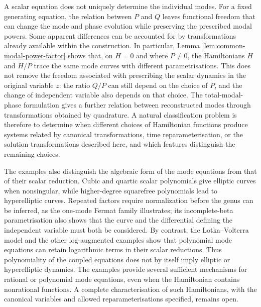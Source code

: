 \documentclass[11pt,a4paper]{article}
\numberwithin{equation}{section}
\begin{document}
A scalar equation does not uniquely determine the individual modes.
For a fixed generating equation, the relation between $P$ and $Q$ leaves functional freedom that can change the mode and phase evolution while preserving the prescribed modal powers.
Some apparent differences can be accounted for by transformations already available within the construction.
In particular, Lemma \ref{lem:common-modal-power-factor} shows that, on $H=0$ and where $P\ne0$, the Hamiltonians $H$ and $H/P$ trace the same mode curves with different parametrisations.
This does not remove the freedom associated with prescribing the scalar dynamics in the original variable $z$: the ratio $Q/P$ can still depend on the choice of $P$, and the change of independent variable also depends on that choice.
The total-modal-phase formulation gives a further relation between reconstructed modes through transformations obtained by quadrature.
A natural classification problem is therefore to determine when different choices of Hamiltonian functions produce systems related by canonical transformations, time reparameterisation, or the solution transformations described here, and which features distinguish the remaining choices.

The examples also distinguish the algebraic form of the mode equations from that of their scalar reduction.
Cubic and quartic scalar polynomials give elliptic curves when nonsingular, while higher-degree squarefree polynomials lead to hyperelliptic curves.
Repeated factors require normalization before the genus can be inferred, as the one-mode Fermat family illustrates; its incomplete-beta parametrisation also shows that the curve and the differential defining the independent variable must both be considered.
By contrast, the Lotka--Volterra model and the other log-augmented examples show that polynomial mode equations can retain logarithmic terms in their scalar reductions.
Thus polynomiality of the coupled equations does not by itself imply elliptic or hyperelliptic dynamics.
The examples provide several sufficient mechanisms for rational or polynomial mode equations, even when the Hamiltonian contains nonrational functions. A complete characterisation of such Hamiltonians, with the canonical variables and allowed reparameterisations specified, remains open.
\end{document}
